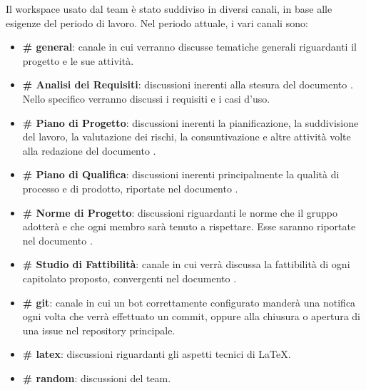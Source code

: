 			Il workspace usato dal team è stato suddiviso in diversi canali, in base alle esigenze del periodo di lavoro. Nel periodo attuale, i vari canali sono:
			\begin{itemize}
				\item \textbf{\# general}: canale in cui verranno discusse tematiche generali riguardanti il progetto e le sue attività.
				\item \textbf{\# Analisi dei Requisiti}: discussioni inerenti alla stesura del documento \Doc{\AdR}. Nello specifico verranno discussi
					 i requisiti e i casi d'uso.
				\item \textbf{\# Piano di Progetto}: discussioni inerenti la pianificazione, la suddivisione del lavoro, la valutazione dei rischi, la consuntivazione e
					altre attività volte alla redazione del documento \Doc{\PdP}.
				\item \textbf{\# Piano di Qualifica}: discussioni inerenti principalmente la qualità di processo e di prodotto, riportate nel documento \Doc{\PdQ}.
				\item \textbf{\# Norme di Progetto}: discussioni riguardanti le norme che il gruppo adotterà e che ogni membro sarà tenuto a rispettare. Esse
					saranno riportate nel documento \Doc{\NdP}.
				\item \textbf{\# Studio di Fattibilità}: canale in cui verrà discussa la fattibilità di ogni capitolato proposto, convergenti nel documento
					\Doc{\SdF}.
				\item \textbf{\# git}: canale in cui un bot correttamente configurato manderà una notifica ogni volta che verrà effettuato un commit, oppure alla chiusura o apertura
					di una issue nel repository principale.
				\item \textbf{\# latex}: discussioni riguardanti gli aspetti tecnici di \LaTeX.
				\item \textbf{\# random}: discussioni  del team.
			\end{itemize}

